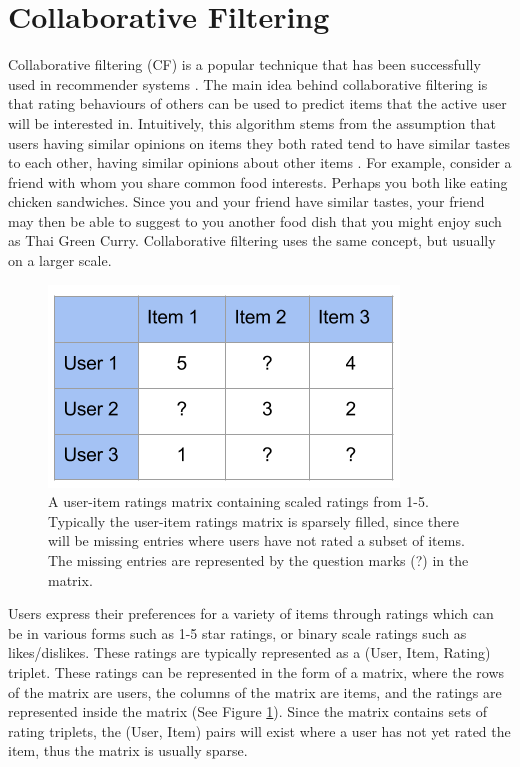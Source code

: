\section{Collaborative Filtering}

Collaborative filtering (CF) is a popular technique that has been successfully used in recommender systems \cite{itembased, schafer2007collaborative, survey}. The main idea behind collaborative filtering is that rating behaviours of others can be used to predict items that the active user will be interested in. Intuitively, this algorithm stems from the assumption that users having similar opinions on items they both rated tend to have similar tastes to each other, having similar opinions about other items  \cite{schafer2007collaborative}. For example, consider a friend with whom you share common food interests. Perhaps you both like eating chicken sandwiches. Since you and your friend have similar tastes, your friend may then be able to suggest to you another food dish that you might enjoy such as Thai Green Curry. Collaborative filtering uses the same concept, but usually on a larger scale. 

\begin{figure}
\centering
\includegraphics[scale=0.7]{images/User-Item}
\caption{A user-item ratings matrix containing scaled ratings from 1-5. Typically the user-item ratings matrix is sparsely filled, since there will be missing entries where users have not rated a subset of items. The missing entries are represented by the question marks (?) in the matrix. }
\label{fig:matrix}
\end{figure}

Users express their preferences for a variety of items through ratings which can be in various forms such as 1-5 star ratings, or binary scale ratings such as likes/dislikes. These ratings are typically represented as a (User, Item, Rating) triplet. These ratings can be represented in the form of a matrix, where the rows of the matrix are users, the columns of the matrix are items, and the ratings are represented inside the matrix (See Figure \ref{fig:matrix}). Since the matrix contains sets of rating triplets, the (User, Item) pairs will exist where a user has not yet rated the item, thus the matrix is usually sparse.

